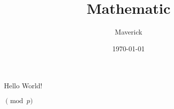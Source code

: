 \documentclass{book}
\title{Mathematic}
\author{Maverick}
\date{\today}
\begin{document}
\maketitle

Hello World!

\(\pmod{p}\)
\end{document}
